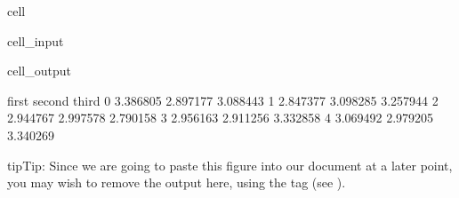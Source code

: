 \documentclass[letterpaper,10pt,english]{jupyterBook}
\begin{document}
\begin{sphinxuseclass}{cell}\begin{sphinxVerbatimInput}

\begin{sphinxuseclass}{cell_input}
\begin{sphinxVerbatim}[commandchars=\\\{\}]
  \PYG{p}{[}\PYG{p}{]}\PYG{p}{[} \PYG{p}{]}
   \PYG{p}{[}  \PYG{p}{]}
 
\end{sphinxVerbatim}

\end{sphinxuseclass}\end{sphinxVerbatimInput}
\begin{sphinxVerbatimOutput}

\begin{sphinxuseclass}{cell_output}
\begin{sphinxVerbatim}[commandchars=\\\{\}]
      first    second     third
0  3.386805  2.897177  3.088443
1  2.847377  3.098285  3.257944
2  2.944767  2.997578  2.790158
3  2.956163  2.911256  3.332858
4  3.069492  2.979205  3.340269
\end{sphinxVerbatim}

\end{sphinxuseclass}\end{sphinxVerbatimOutput}

\end{sphinxuseclass}
\begin{sphinxadmonition}{tip}{Tip:}
\sphinxAtStartPar
Since we are going to paste this figure into our document at a later point,
you may wish to remove the output here, using the  tag
(see ).
\end{sphinxadmonition}
\end{document}
